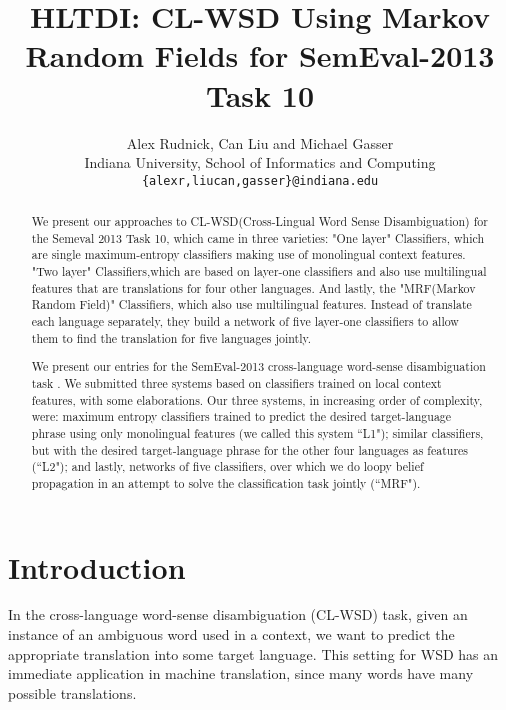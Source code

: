 \documentclass[11pt,letterpaper]{article}
\title{HLTDI: CL-WSD Using Markov Random Fields for SemEval-2013 Task 10}
\author{Alex Rudnick, Can Liu and Michael Gasser\\
	    Indiana University, School of Informatics and Computing \\
	    {\tt \{alexr,liucan,gasser\}@indiana.edu}}
\date{}
\begin{document}
\maketitle

\begin{abstract}

We present our approaches to CL-WSD(Cross-Lingual Word Sense Disambiguation) for the Semeval 2013 Task 10, which came in
three varieties: 
"One layer" Classifiers, which are single maximum-entropy classifiers making use of monolingual context features. %
 "Two layer" Classifiers,which are based on layer-one classifiers and also use multilingual features that are translations for four other languages. 
And lastly, the "MRF(Markov Random Field)" Classifiers, which also use multilingual features. Instead of translate each language separately, they build a network of five layer-one classifiers to allow them to find the translation for five languages jointly.%

We present our entries for the SemEval-2013 cross-language word-sense
disambiguation task \cite{task10}. We submitted three systems based
on classifiers trained on local context features, with some elaborations.
Our three systems, in increasing order of complexity, were: maximum entropy
classifiers trained to predict the desired target-language phrase using only monolingual features (we called this system ``L1"); similar classifiers, but with the desired target-language
phrase for the other four languages as features (``L2"); and lastly, networks
of five classifiers, over which we do loopy belief propagation in an attempt to
solve the classification task jointly (``MRF").
\end{abstract}

\section{Introduction}
In the cross-language word-sense disambiguation (CL-WSD) task, given an
instance of an ambiguous word used in a context, we want to predict the
appropriate translation into some target language. This setting for WSD has an
immediate application in machine translation, since many words have many
possible translations.
\end{document}
